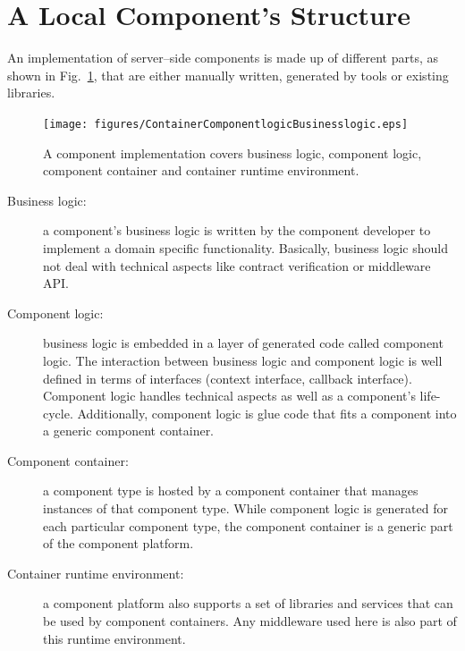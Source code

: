 \section{A Local Component's Structure}
\label{ComponentStructure}

An implementation of server--side components is made up of different parts,
as shown in Fig.~\ref{ContainerComponentlogicBusinesslogic}, that are either
manually written, generated by tools or existing libraries.

\begin{figure}[htbp]
    \begin{center}
    \texttt{[image: figures/ContainerComponentlogicBusinesslogic.eps]}
    \caption{A component implementation covers business logic, component
    logic, component container and container runtime environment.}
    \label{ContainerComponentlogicBusinesslogic}            
    \end{center}
\end{figure}

\begin{description}
\item [Business logic:]
  a component's business logic is written by the component developer to 
  implement   a domain specific functionality.
  Basically, business logic should not deal with technical aspects like contract
  verification or middleware API.
  
\item [Component logic:]
  business logic is embedded in a layer of generated code called component 
  logic. The interaction between business logic and component logic is well 
  defined in terms of interfaces (context interface, callback interface).
  Component logic handles technical aspects as well as a component's life-cycle.
  Additionally, component logic is glue code that fits a component into a 
  generic component container.
  
\item [Component container:]
  a component type is hosted by a component container that manages instances of
  that component type.
  While component logic is generated for each particular component type, the 
  component container is a generic part of the component platform.
  
\item [Container runtime environment:]
  a component platform also supports a set of libraries and services that can 
  be used by component containers.
  Any middleware used here is also part of this runtime environment.
\end{description}



